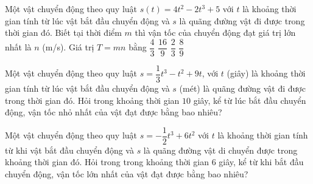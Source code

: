 \begin{ex}%
	Một vật chuyển động theo quy luật $s(t)=4t^{2}-2t^{3}+5$ với $t$  là khoảng thời gian tính từ lúc vật bắt đầu chuyển động và $s$ là quãng đường vật đi được trong thời gian đó. Biết tại thời điểm $m$ thì vận tốc của chuyển động đạt giá trị lớn nhất là $n$ (m/s). Giá trị $T = mn$ bằng
	\choice 
		 {$\dfrac{4}{3}$}
		{\True  $\dfrac{16}{9}$}
		 {$\dfrac{2}{3}$}
		{$\dfrac{8}{9}$} 
\end{ex}

\begin{ex}%
	Một vật chuyển động theo quy luật $s=\dfrac{1}{3}t^3-t^2+9 t$, với $t$ (giây) là khoảng thời gian tính từ lúc vật bắt  đầu chuyển động và $s$ (mét) là quãng đường vật đi được trong thời gian đó. Hỏi trong khoảng thời gian $10$ giây, kể từ lúc bắt đầu chuyển động, vận tốc nhỏ nhất của vật đạt được bằng bao nhiêu?\\
\end{ex}

\begin{bt}%
	Một vật chuyển động theo quy luật $s=-\dfrac{1}{2}{t^3}+6t^2$ với $t$ là khoảng thời gian tính từ khi vật bắt đầu chuyển động và $s$ là quãng đường vật di chuyển được trong khoảng thời gian đó. Hỏi trong trong khoảng thời  gian $ 6$ giây, kể từ khi bắt đầu chuyển động, vận tốc lớn nhất của vật đạt được bằng bao nhiêu?
\end{bt}

